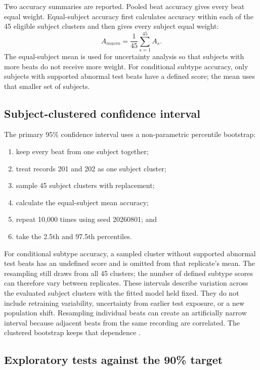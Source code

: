 Two accuracy summaries are reported. Pooled beat accuracy gives every beat
equal weight. Equal-subject accuracy first calculates accuracy within each of
the 45 eligible subject clusters and then gives every subject equal weight:
\begin{equation}
 A_{macro}=\frac{1}{45}\sum_{s=1}^{45}A_s.
 \label{eq:subject-macro}
\end{equation}
The equal-subject mean is used for uncertainty analysis so that subjects
with more beats do not receive more weight. For conditional subtype accuracy,
only subjects with supported abnormal test beats have a defined score; the
mean uses that smaller set of subjects.

\subsection{Subject-clustered confidence interval}

The primary 95\% confidence interval uses a non-parametric percentile
bootstrap:
\begin{enumerate}
    \item keep every beat from one subject together;
    \item treat records 201 and 202 as one subject cluster;
    \item sample 45 subject clusters with replacement;
    \item calculate the equal-subject mean accuracy;
    \item repeat 10,000 times using seed 20260801; and
    \item take the 2.5th and 97.5th percentiles.
\end{enumerate}
For conditional subtype accuracy, a sampled cluster without supported
abnormal test beats has an undefined score and is omitted from that
replicate's mean. The resampling still draws from all 45 clusters; the
number of defined subtype scores can therefore vary between replicates.
These intervals describe variation across the evaluated subject clusters with
the fitted model held fixed. They do not include retraining variability,
uncertainty from earlier test exposure, or a new population shift.
Resampling individual beats can create an artificially narrow interval
because adjacent beats from the same recording are correlated. The clustered
bootstrap keeps that dependence \cite{rutter2000clustered}.

\subsection{Exploratory tests against the 90\% target}

